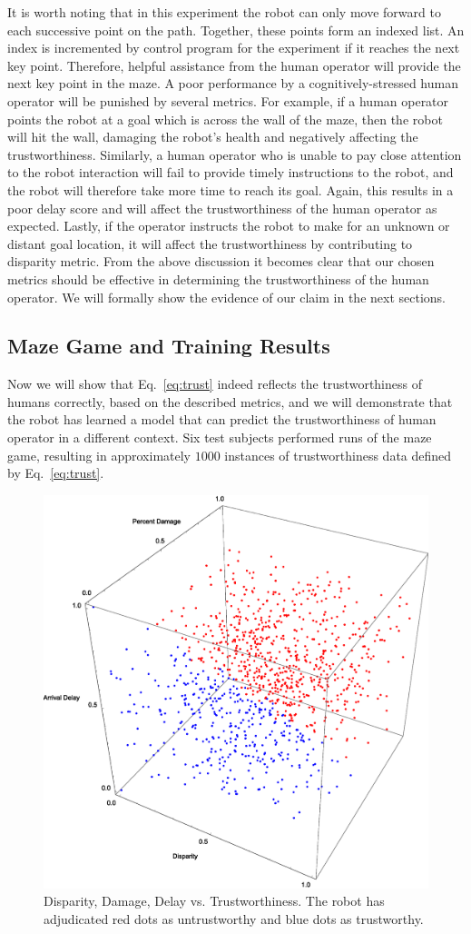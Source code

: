 \documentclass{sig-alternate}
\begin{document}
It is worth noting that in this experiment the robot can only move
forward to each successive point on the path. Together, these points
form an indexed list. An index is incremented by control program for
the experiment if it reaches the next key point. Therefore, helpful
assistance from the human operator will provide the next key point in
the maze. A poor performance by a cognitively-stressed human operator
will be punished by several metrics. For example, if a human operator
points the robot at a goal which is across the wall of the maze, then
the robot will hit the wall, damaging the robot's health and
negatively affecting the trustworthiness.  Similarly, a human operator
who is unable to pay close attention to the robot interaction will
fail to provide timely instructions to the robot, and the robot will
therefore take more time to reach its goal.  Again, this results in a
poor delay score and will affect the trustworthiness of the human
operator as expected. Lastly, if the operator instructs the robot to
make for an unknown or distant goal location, it will affect the
trustworthiness by contributing to disparity metric.  From the above
discussion it becomes clear that our chosen metrics should be
effective in determining the trustworthiness of the human operator. We
will formally show the evidence of our claim in the next sections.

\subsection{Maze Game and Training Results}
Now we will show that Eq.~\ref{eq:trust} indeed reflects the
trustworthiness of humans correctly, based on the described metrics,
and we will demonstrate that the robot has learned a model that can
predict the trustworthiness of human operator in a different context.
Six test subjects performed runs of the maze game, resulting in
approximately $1000$ instances of trustworthiness data defined by
Eq.~\ref{eq:trust}.

\begin{figure}
\centering
\includegraphics[width=.5\textwidth]{4d-plot.eps}
\caption{Disparity, Damage, Delay vs. Trustworthiness.  The robot has
  adjudicated red dots as untrustworthy and blue dots as trustworthy.}
\label{fig:data_maze_game}
\end{figure}
\end{document}
